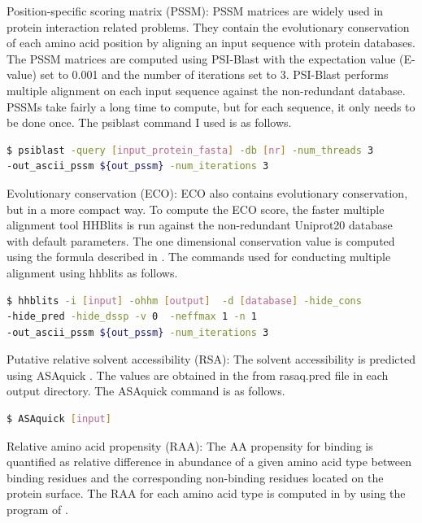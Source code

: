 Position-specific scoring matrix (PSSM): PSSM matrices are widely used in protein interaction related problems. They contain the evolutionary conservation of each amino acid position by aligning an input sequence with protein databases. The PSSM matrices are computed using PSI-Blast \cite{altschul1997gapped} with the expectation value (E-value) set to 0.001 and the number of iterations set to 3. PSI-Blast performs multiple alignment on each input sequence against the non-redundant database. PSSMs take fairly a long time to compute, but for each sequence, it only needs to be done once. The psiblast command I used is as follows.
\begin{lstlisting}[language=bash,frame=single]
$ psiblast -query [input_protein_fasta] -db [nr] -num_threads 3
-out_ascii_pssm ${out_pssm} -num_iterations 3
\end{lstlisting}

Evolutionary conservation (ECO): ECO also contains evolutionary conservation, but in a more compact way. To compute the ECO score, the faster multiple alignment tool HHBlits \cite{remmert2012hhblits} is run against the non-redundant Uniprot20 database with default parameters. The one dimensional conservation value is computed using the formula described in \cite{zhang2019comprehensive}. The commands used for conducting multiple alignment using hhblits as follows.
\begin{lstlisting}[language=bash,frame=single]
$ hhblits -i [input] -ohhm [output]  -d [database] -hide_cons 
-hide_pred -hide_dssp -v 0  -neffmax 1 -n 1
-out_ascii_pssm ${out_pssm} -num_iterations 3
\end{lstlisting}

Putative relative solvent accessibility (RSA): The solvent accessibility is predicted using ASAquick \cite{faraggi2014accurate}. The values are obtained in the from rasaq.pred file in each output directory. The ASAquick command is as follows.
\begin{lstlisting}[language=bash,frame=single]
$ ASAquick [input]
\end{lstlisting}


Relative amino acid propensity (RAA): The AA propensity for binding is quantified as relative difference in abundance of a given amino acid type between binding residues and the corresponding non-binding residues located on the protein surface. The RAA for each amino acid type is computed in \cite{zhang2019comprehensive} by using the program of  \cite{vacic2007composition}.


